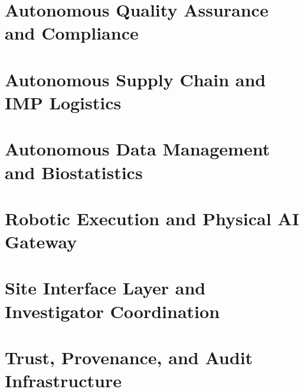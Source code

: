 \documentclass{article}
\begin{document}
\section{Autonomous Quality Assurance and Compliance}
\label{sec:quality}

\newpage

\section{Autonomous Supply Chain and IMP Logistics}
\label{sec:supply}

\newpage

\section{Autonomous Data Management and Biostatistics}
\label{sec:data}

\newpage

\section{Robotic Execution and Physical AI Gateway}
\label{sec:robotics}

\newpage

\section{Site Interface Layer and Investigator Coordination}
\label{sec:site-interface}

\newpage

\section{Trust, Provenance, and Audit Infrastructure}
\label{sec:trust}

\newpage
\end{document}
